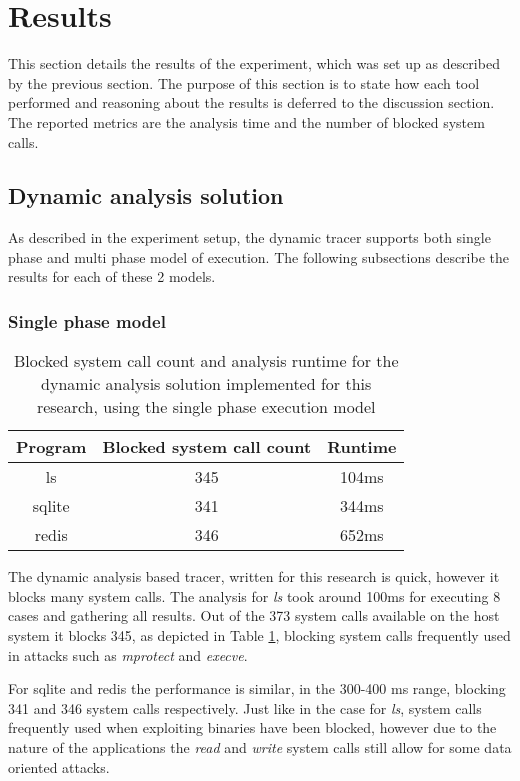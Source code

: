 \section{Results}
\label{sec:results}
This section details the results of the experiment, which was set up as described by the previous section.
The purpose of this section is to state how each tool performed and reasoning about the results is deferred to the discussion section.
The reported metrics are the analysis time and the number of blocked system calls.

\subsection {Dynamic analysis solution}
As described in the experiment setup, the dynamic tracer supports both single phase and multi phase model of execution.
The following subsections describe the results for each of these 2 models.

\subsubsection {Single phase model}
\begin{table}[!h]
\begin{center}
\caption{Blocked system call count and analysis runtime for the dynamic analysis solution implemented for this research, using the single phase execution model}
\label{tbl:dyn_results}
\begin{tabular}{||c c c||} 
 \hline
 Program & Blocked system call count & Runtime \\
 \hline\hline
 ls & 345 & 104ms \\ 
 \hline
 sqlite & 341 & 344ms \\ 
 \hline
 redis & 346 & 652ms \\
 \hline
\end{tabular}
\end{center}
\end{table}

The dynamic analysis based tracer, written for this research is quick, however it blocks many system calls.
The analysis for \textit{ls} took around 100ms for executing 8 cases and gathering all results.
Out of the 373 system calls available on the host system it blocks 345, as depicted in Table \ref{tbl:dyn_results}, blocking system calls frequently used in attacks such as \textit{mprotect} and \textit{execve}.

For sqlite and redis the performance is similar, in the 300-400 ms range, blocking 341 and 346 system calls respectively. Just like in the case for \textit{ls}, system calls frequently used when exploiting binaries have been blocked, however due to the nature of the applications the \textit{read} and \textit{write} system calls still allow for some data oriented attacks.

